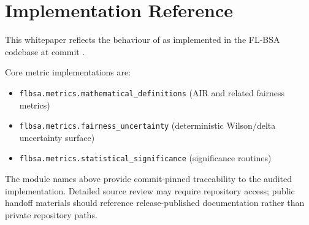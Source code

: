 
\section{Implementation Reference}
This whitepaper reflects the behaviour of \sysname{} as implemented in the FL-BSA codebase at commit \CodeCommitDisplay{}.

Core metric implementations are:
\begin{itemize}[leftmargin=*]
\item \texttt{flbsa.metrics.mathematical\_definitions} (AIR and related fairness metrics)
\item \texttt{flbsa.metrics.fairness\_uncertainty} (deterministic Wilson/delta uncertainty surface)
\item \texttt{flbsa.metrics.statistical\_significance} (significance routines)
\end{itemize}

The module names above provide commit-pinned traceability to the audited implementation. Detailed source review may require repository access; public handoff materials should reference release-published documentation rather than private repository paths.
